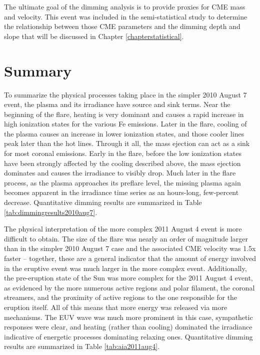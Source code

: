 The ultimate goal of the dimming analysis is to provide proxies for CME mass and velocity. This event was included in the semi-statistical study to determine the relationship between those CME parameters and the dimming depth and slope that will be discussed in Chapter \ref{chapterstatistical}. 


\section{Summary}
To summarize the physical processes taking place in the simpler 2010 August 7 event, the plasma and its irradiance have source and sink terms. Near the beginning of the flare, heating is very dominant and causes a rapid increase in high ionization states for the various Fe emissions. Later in the flare, cooling of the plasma causes an increase in lower ionization states, and those cooler lines peak later than the hot lines. Through it all, the mass ejection can act as a sink for most coronal emissions. Early in the flare, before the low ionization states have been strongly affected by the cooling described above, the mass ejection dominates and causes the irradiance to visibly drop. Much later in the flare process, as the plasma approaches its preflare level, the missing plasma again becomes apparent in the irradiance time series as an hours-long, few-percent decrease. Quantitative dimming results are summarized in Table \ref{tab:dimmingresults2010aug7}. 

The physical interpretation of the more complex 2011 August 4 event is more difficult to obtain. The size of the flare was nearly an order of magnitude larger than in the simpler 2010 August 7 case and the associated CME velocity was 1.5x faster -- together, these are a general indicator that the amount of energy involved in the eruptive event was much larger in the more complex event. Additionally, the pre-eruption state of the Sun was more complex for the 2011 August 4 event, as evidenced by the more numerous active regions and polar filament, the coronal streamers, and the proximity of active regions to the one responsible for the eruption itself. All of this means that more energy was released via more mechanisms. The EUV wave was much more prominent in this case, sympathetic responses were clear, and heating (rather than cooling) dominated the irradiance indicative of energetic processes dominating relaxing ones. Quantitative dimming results are summarized in Table \ref{tab:aia2011aug4}. 